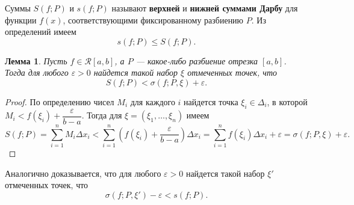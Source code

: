 \documentclass[12pt]{report}
\numberwithin{equation}{section}
\newtheorem{lemma}{Лемма}[section]
\begin{document}
Суммы $S(f;P)$ и $s(f; P)$ называют \textbf{верхней} и \textbf{нижней суммами Дарбу} для функции $f(x)$, соответствующими фиксированному разбиению $P$. Из определений имеем
\begin{equation} \label{eq:5:2}
s(f;P) \leqslant S(f;P).
\end{equation}

\begin{lemma}
Пусть $f \in \mathcal{R}[a,b]$, а $P$ --- какое-либо разбиение отрезка $[a,b]$. Тогда для любого $\varepsilon > 0$ найдется такой набор $\xi$ отмеченных точек, что
\begin{equation} \label{eq:5:3}
S(f;P) < \sigma (f; P, \xi) + \varepsilon.
\end{equation}
\end{lemma}
\begin{proof}
По определению чисел $M_i$ для каждого $i$ найдется точка $\xi_i \in \Delta _i$, в которой $M_i < f(\xi_i) + \dfrac{\varepsilon}{b - a}$. Тогда для $\xi = (\xi_1, \ldots, \xi_n)$ имеем
\[ S(f;P) = \sum_{i=1}^n M_i \Delta x_i < \sum_{i=1}^n \left( f(\xi_i) + \frac{\varepsilon}{b - a}\right) \Delta x_i = \sum_{i = 1}^n f(\xi_i) \Delta x_i + \varepsilon = \sigma(f; P, \xi) + \varepsilon. \]
\end{proof}

Аналогично доказывается, что для любого $\varepsilon > 0$ найдется такой набор $\xi'$ отмеченных точек, что
\begin{equation}\label{eq:5:4}
\sigma(f;P, \xi') - \varepsilon < s(f;P). 
\end{equation}
\end{document}
